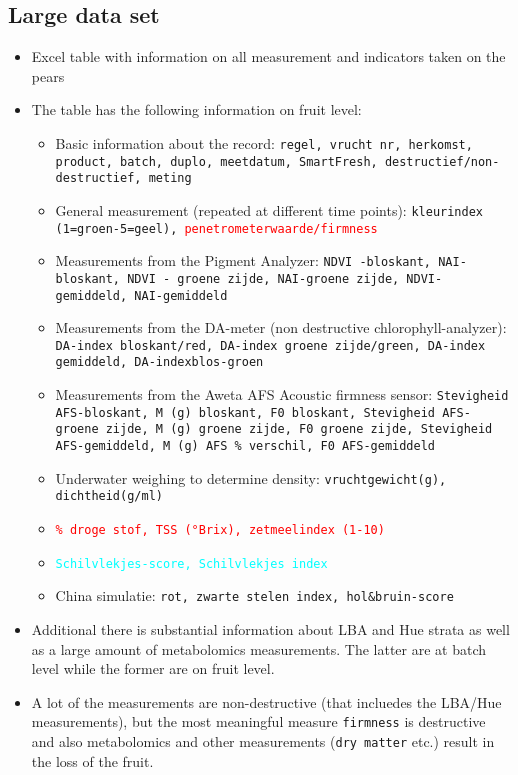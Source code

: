 \documentclass[12pt, a4paper]{article}
\begin{document}
\subsection*{Large data set}
\begin{itemize}
\item Excel table with information on all measurement and indicators taken on the pears
\item The table has the following information on fruit level:
	\begin{itemize}
		\item Basic information about the record: \newline 
			\texttt{regel, vrucht nr, herkomst, product, batch, duplo, 	meetdatum, SmartFresh, \newline destructief/non-destructief, meting}
		\item General measurement (repeated at different time points): \newline 
			\texttt{kleurindex (1=groen-5=geel), \textcolor{red}{penetrometerwaarde/firmness}}
		\item Measurements from the Pigment Analyzer: \newline
			\texttt{NDVI -bloskant, NAI-bloskant, NDVI - groene zijde, NAI-groene zijde, NDVI-gemiddeld, NAI-gemiddeld}
		\item Measurements from the DA-meter (non destructive chlorophyll-analyzer): \newline
			\texttt{DA-index bloskant/red, DA-index groene zijde/green, DA-index gemiddeld, DA-indexblos-groen}
		\item Measurements from the Aweta AFS Acoustic firmness sensor: \newline
			\texttt{Stevigheid AFS-bloskant, M (g) bloskant, F0 bloskant, Stevigheid AFS-groene zijde, M (g) groene zijde, F0 groene zijde, Stevigheid AFS-gemiddeld, M (g) AFS \% verschil, F0 AFS-gemiddeld}
		\item Underwater weighing to determine density: 
			\texttt{vruchtgewicht(g), dichtheid(g/ml)}
		\item \texttt{\textcolor{red}{\% droge stof, TSS (°Brix), zetmeelindex (1-10)}}
		\item \texttt{\textcolor{cyan}{Schilvlekjes-score, Schilvlekjes index}}
		\item China simulatie:
			\texttt{rot, zwarte stelen index, hol\&bruin-score}	
	\end{itemize} 
\item Additional there is substantial information about LBA and Hue strata as well as a large amount of metabolomics 
	measurements. The latter are at batch level while the former are on fruit level.
\item A lot of the measurements are non-destructive (that incluedes the LBA/Hue measurements), but the most meaningful
	measure \texttt{firmness} is destructive and also metabolomics and other measurements (\texttt{dry matter} etc.) result 
	in the loss of the fruit.
\end{itemize}
\end{document}

